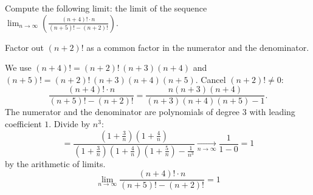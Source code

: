 
\begin{question}
Compute the following limit:
the limit of the sequence $\displaystyle\lim_{n\to\infty}\left(\frac{(n+4)!\cdot n}{(n+5)!-(n+2)!}\right)$.
\end{question}

\begin{hint}
Factor out $(n+2)!$ as a common factor in the numerator and the denominator.
\end{hint}

\begin{solution}
We use $(n+4)!=(n+2)!\,(n+3)(n+4)$ and $(n+5)!=(n+2)!\,(n+3)(n+4)(n+5)$. Cancel $(n+2)!\neq0$:
\[ \frac{(n+4)!\cdot n}{(n+5)!-(n+2)!}=\frac{n(n+3)(n+4)}{(n+3)(n+4)(n+5)-1}. \]
The numerator and the denominator are polynomials of degree $3$ with leading coefficient $1$. Divide by $n^3$:
\[ =\frac{\left(1+\frac3n\right)\left(1+\frac4n\right)}{\left(1+\frac3n\right)\left(1+\frac4n\right)\left(1+\frac5n\right)-\frac1{n^3}}\xrightarrow[n\to\infty]{}\frac{1}{1-0}=1 \]
by the arithmetic of limits.
\[ \boxed{\lim_{n\to\infty}\frac{(n+4)!\cdot n}{(n+5)!-(n+2)!}=1} \]
\end{solution}
